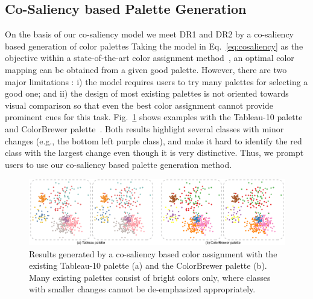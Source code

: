 \subsection{Co-Saliency based Palette Generation}
\label{subsec:solver}
On the basis of our co-saliency model we meet DR1 and DR2 by a co-saliency based generation of color palettes %
Taking the model in Eq.~\ref{eq:cosaliency} as the objective within a state-of-the-art color assignment method~\cite{Wang2018}, an optimal color mapping can be obtained from a given  good palette. However, there are two major limitations : i) the model requires users to try many palettes for selecting a good one; and ii) the design of most existing palettes is not oriented towards visual comparison so that even the best color assignment cannot provide prominent cues for this task.
Fig.~\ref{fig:colorbrewer} shows examples with the Tableau-10 palette and ColorBrewer palette~\cite{harrower2003colorbrewer}. Both results highlight several classes with minor changes (e.g., the bottom left purple class), and make it hard to identify the red class with the largest change  even though it is very distinctive. Thus, we prompt users to use our co-saliency based palette generation method.


\begin{figure}[!tb]
\centering
\includegraphics[width=1\columnwidth]{figures/colorbrewer.pdf}
\caption{Results generated by a co-saliency based color assignment with the existing
Tableau-10 palette (a) and the ColorBrewer palette (b). Many existing palettes consist of   bright colors only, where classes with smaller changes cannot be de-emphasized appropriately.}
\vspace*{-3mm}
\label{fig:colorbrewer}
\end{figure}

